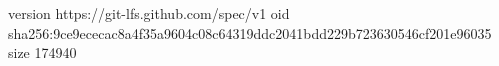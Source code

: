 version https://git-lfs.github.com/spec/v1
oid sha256:9ce9ececac8a4f35a9604c08c64319ddc2041bdd229b723630546cf201e96035
size 174940

